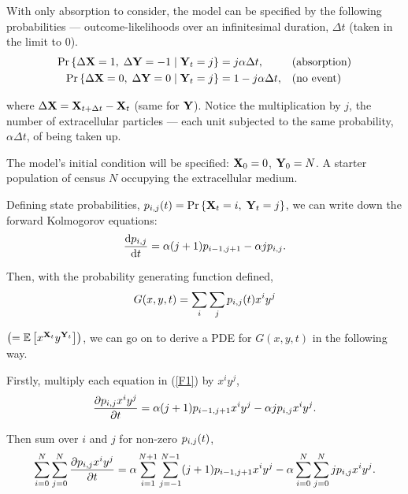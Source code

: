 With only absorption to consider, the model can be specified by the following probabilities --- outcome-likelihoods over an infinitesimal duration, $\Delta t$ (taken in the limit to 0).
\begin{align*}
     {\text{Pr}\left\{\Delta{\bf X}= 1,\;\Delta{\bf Y}= -1 \;|\; {{\bf Y}_t}= j\right\}} &= j \alpha \Delta t,  &&\text{(absorption)}\\
     {\text{Pr}\left\{\Delta{\bf X}= 0,\;\Delta{\bf Y} = 0 \;|\; {{\bf Y}_t} = j\right\}} &= 1 -  j \alpha \Delta t,  &&\text{(no event)}
\end{align*} 


\noindent
where $\Delta {\bf X} = {\bf X}_{t+\Delta t} - {{\bf X}_t}$ (same for ${\bf Y}$). Notice the multiplication by $j$, the number of extracellular particles --- each unit subjected to the same probability, $\alpha \Delta t$, of being taken up. 

The model's initial condition will be specified: ${\bf X}_0 = 0$, ${\bf Y}_0 = N$. A starter population of census $N$ occupying the extracellular medium. 

Defining state probabilities, $p_{i,j}(t) = {\text{Pr}\left\{{{\bf X}_t} = i,\; {{\bf Y}_t} = j\right\}}$, we can write down the forward Kolmogorov equations: 
\begin{equation}
\label{F1}
\displaystyle\frac{{\rm d} p_{i,j}}{{\rm d} t} = \alpha(j + 1) p_{i-1,j+1} - \alpha j p_{i,j}.
\end{equation}

\noindent
Then, with the probability generating function defined,
\begin{equation}
\label{pgfDef}
G(x,y,t) = \sum_i\sum_j p_{i,j}(t) x^iy^j 
\end{equation}

\noindent
$\left(=\mathbb{E}\left[x^{{{\bf X}_t}}y^{{{\bf Y}_t}}\right]\right)$, we can go on to derive a PDE for $G(x,y,t)$ in the following way. 

Firstly, multiply each equation in (\ref{F1}) by $x^iy^j $,
\begin{equation*}
\displaystyle\frac{\partial p_{i,j} x^iy^j}{\partial t} = \alpha(j + 1) p_{i-1,j+1}x^iy^j - \alpha j p_{i,j} x^iy^j.
\end{equation*}

\noindent
Then sum over $i$ and $j$ for non-zero $p_{i,j}(t)$,
\begin{equation}
\label{pdeDere2}
\sum_{i = 0}^N\sum_{j=0}^N\displaystyle\frac{\partial p_{i,j} x^iy^j}{\partial t} = \alpha\sum_{i = 1}^{N+1}\sum_{j=-1}^{N-1}(j + 1) p_{i-1,j+1}x^iy^j - \alpha \sum_{i = 0}^N\sum_{j=0}^Nj p_{i,j} x^iy^j.
\end{equation}

